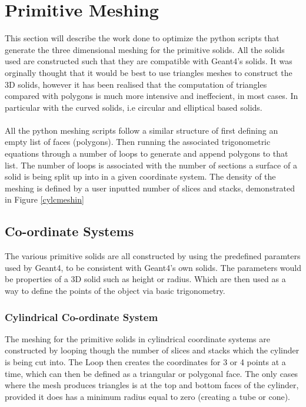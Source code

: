 \documentclass[12pt,a4paper]{article}
\begin{document}
\section{Primitive Meshing}
This section will describe the work done to optimize the python scripts that generate the three dimensional meshing for the primitive solids. All the solids used are constructed such that they are compatible with Geant4's solids. It was orginally thought that it would be best to use triangles meshes to construct the 3D solids, however it has been realised that the computation of triangles compared with polygons is much more intensive and ineffecient, in most cases. In particular with the curved solids, i.e circular and elliptical based solids.
\\\\
All the python meshing scripts follow a similar structure of first defining an empty list of faces (polygons). Then running the associated trigonometric equations through a number of loops to generate and append polygons to that list. The number of loops is associated with the number of sections a surface of a solid is being split up into in a given coordinate system. The density of the meshing is defined by a user inputted number of slices and stacks, demonstrated in Figure \ref{cylcmeshin}

\subsection{Co-ordinate Systems}
The various primitive solids are all constructed by using the predefined paramters used by Geant4, to be consistent with Geant4's own solids. The parameters would be properties of a 3D solid such as height or radius. Which are then used as a way to define the points of the object via basic trigonometry.\

\subsubsection{Cylindrical Co-ordinate System}
The meshing for the primitive solids in cylindrical coordinate systems are constructed by looping though the number of slices and stacks which the cylinder is being cut into. The Loop then creates the coordinates for 3 or 4 points at a time, which can then be defined as a triangular or polygonal face. The only cases where the mesh produces triangles is at the top and bottom faces of the cylinder, provided it does has a minimum radius equal to zero (creating a tube or cone). 
\end{document}
